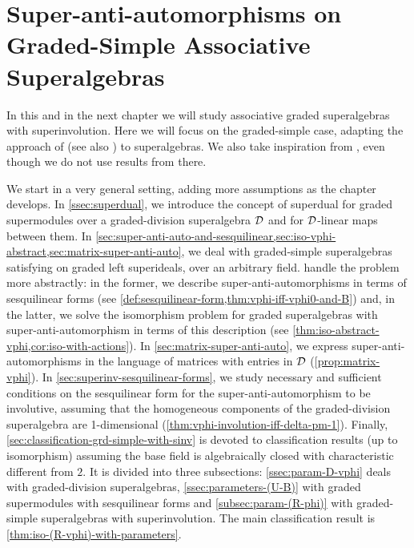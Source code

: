 \chapter{Super-anti-automorphisms on Graded-Simple Associative Superalgebras}\label{chap:super-inv}


In this and in the next chapter we will study associative graded superalgebras with superinvolution. 
Here we will focus on the graded-simple case, adapting the approach of \cite{Eld10} (see also \cite[Section 2.4]{livromicha}) to superalgebras. 
We also take inspiration from \cite{paper-adrian}, even though we do not use results from there. 

We start in a very general setting, adding more assumptions as the chapter develops. 
In \cref{ssec:superdual}, we introduce the concept of superdual for graded supermodules over a graded-division superalgebra $\mathcal{D}$ and for $\mathcal{D}$-linear maps between them. 
In \cref{sec:super-anti-auto-and-sesquilinear,sec:iso-vphi-abstract,sec:matrix-super-anti-auto}, we deal with graded-simple superalgebras satisfying \dcc on graded left superideals, over an arbitrary field. 
 handle the problem more abstractly: in the former, we describe super-anti-automorphisms in terms of sesquilinear forms (see \cref{def:sesquilinear-form,thm:vphi-iff-vphi0-and-B}) and, in the latter,
we solve the isomorphism problem for graded superalgebras with super-anti-automorphism in terms of this description (see \cref{thm:iso-abstract-vphi,cor:iso-with-actions}). 
In \cref{sec:matrix-super-anti-auto}, we express super-anti-automorphisms in the language of matrices with entries in $\mathcal{D}$ (\cref{prop:matrix-vphi}). 
In \cref{sec:superinv-sesquilinear-forms}, we study necessary and sufficient conditions on the sesquilinear form for the super-anti-automorphism to be involutive, assuming that the homogeneous components of the graded-division superalgebra are 1-dimensional (\cref{thm:vphi-involution-iff-delta-pm-1}). 
Finally, \cref{sec:classification-grd-simple-with-sinv} is devoted to classification results (up to isomorphism) assuming the base field is algebraically closed with characteristic different from $2$. 
It is divided into three subsections: \cref{ssec:param-D-vphi} deals with graded-division superalgebras, \cref{ssec:parameters-(U-B)} with graded supermodules with sesquilinear forms and \cref{subsec:param-(R-phi)} with graded-simple superalgebras with superinvolution. 
The main classification result is \cref{thm:iso-(R-vphi)-with-parameters}. 

